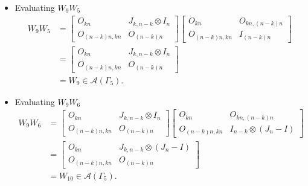 \begin{itemize}
\item Evaluating $W_{9}W_{5}$
\begin{align*}
    W_9W_5
    &= \begin{bmatrix}
        O_{kn} & J_{k,n-k} \otimes I_n \\
        O_{(n-k)n,kn} & O_{(n-k)n}
    \end{bmatrix}\begin{bmatrix}
        O_{kn} & O_{kn, (n-k)n} \\
        O_{(n-k)n,kn} & I_{(n - k)n}
    \end{bmatrix}\\
    &= \begin{bmatrix}
        O_{kn} & J_{k,n-k} \otimes I_n \\
        O_{(n-k)n,kn} & O_{(n-k)n}
    \end{bmatrix}\\
    &=W_9\in\mathcal{A}(\Gamma_5).
\end{align*}

\item Evaluating $W_{9}W_{6}$
\begin{align*}
    W_9W_6
    &= \begin{bmatrix}
        O_{kn} & J_{k,n-k} \otimes I_n \\
        O_{(n-k)n,kn} & O_{(n-k)n}
    \end{bmatrix}\begin{bmatrix}
        O_{kn} & O_{kn, (n-k)n} \\
        O_{(n-k)n,kn} & I_{n-k}\otimes (J_n-I)
    \end{bmatrix}\\
    &= \begin{bmatrix}
        O_{kn} & J_{k,n-k} \otimes (J_n-I) \\
        O_{(n-k)n,kn} & O_{(n-k)n}
    \end{bmatrix}\\
    &=W_{10}\in\mathcal{A}(\Gamma_5).
\end{align*}


\end{itemize}
